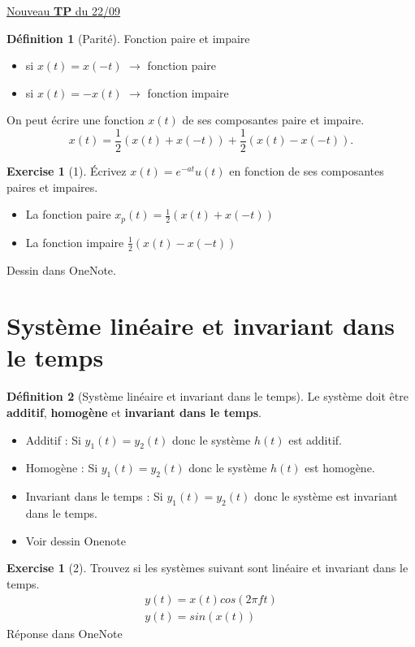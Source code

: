 \documentclass{article}
\theoremstyle{plain}%
\theoremstyle{definition}
\newtheorem{defn}{Définition}[section]
\newtheorem{xca}[exmp]{Exercise}
\theoremstyle{remark}
\begin{document}
\underline{Nouveau \textbf{TP} du 22/09} \\

\begin{defn}[Parité]
    Fonction paire et impaire 
    \begin{itemize}
        \item si $ x(t) = x(-t) $ $\rightarrow$ fonction paire
        \item si $ x(t) = -x(t) $ $\rightarrow$ fonction impaire
    \end{itemize}
    On peut écrire une fonction $ x(t) $ de ses composantes paire et impaire.
    \[
        x(t) = \frac{1}{2}(x(t) + x(-t)) + \frac{1}{2}(x(t) - x(-t))
    .\]
\end{defn}


\begin{xca}[1]
    Écrivez $ x(t) = e^{-at}u(t)$ en fonction de ses composantes paires et impaires. \begin{itemize}
        \item La fonction paire $ x_p(t) = \frac{1}{2}(x(t) + x(-t)) $ 
        \item La fonction impaire $ \frac{1}{2} (x(t) - x(-t)) $ 
    \end{itemize}
    Dessin dans OneNote.
\end{xca}

\section{Système linéaire et invariant dans le temps}
\begin{defn}[Système linéaire et invariant dans le temps]
    Le système doit être \textbf{additif}, \textbf{homogène} et \textbf{invariant dans le temps}. \begin{itemize}
        \item Additif : Si $ y_1(t) = y_2(t) $ donc le système $ h(t) $ est additif.
        \item Homogène : Si $ y_1(t) = y_2(t) $ donc le système $ h(t) $ est homogène.
        \item Invariant dans le temps : Si $ y_1(t) = y_2(t) $ donc le système est invariant dans le temps.
        \item Voir dessin Onenote
    \end{itemize}
\end{defn}

\begin{xca}[2]
    Trouvez si les systèmes suivant sont linéaire et invariant dans le temps.\begin{align}
        y(t) = x(t)cos(2 \pi ft)\\
        y(t) = sin(x(t))
    \end{align}
    Réponse dans OneNote
\end{xca}
\end{document}
